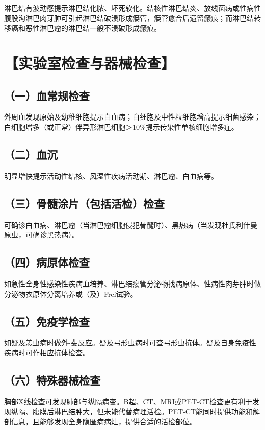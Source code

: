 淋巴结有波动感提示淋巴结化脓、坏死软化。结核性淋巴结炎、放线菌病或性病性腹股沟淋巴肉芽肿可引起淋巴结破溃形成瘘管，瘘管愈合后遗留瘢痕；而淋巴结转移癌和恶性淋巴瘤的淋巴结一般不溃破形成瘢痕。

\section{【实验室检查与器械检查】}

\subsection{（一）血常规检查}

外周血发现原始及幼稚细胞提示白血病；白细胞及中性粒细胞增高提示细菌感染；白细胞增多（或正常）伴异形淋巴细胞＞10\%提示传染性单核细胞增多症。

\subsection{（二）血沉}

明显增快提示活动性结核、风湿性疾病活动期、淋巴瘤、白血病等。

\subsection{（三）骨髓涂片（包括活检）检查}

可确诊白血病、淋巴瘤（当淋巴瘤细胞侵犯骨髓时）、黑热病（当发现杜氏利什曼原虫，可确诊黑热病）。

\subsection{（四）病原体检查}

如急性全身性感染性疾病血培养、淋巴结瘘管分泌物找病原体、性病性肉芽肿时做分泌物衣原体分离培养或（及）Frei试验。

\subsection{（五）免疫学检查}

如疑及恙虫病时做外-斐反应。疑及弓形虫病时可查弓形虫抗体。疑及自身免疫性疾病时可作相应抗体检查。

\subsection{（六）特殊器械检查}

胸部X线检查可发现肺部与纵隔病变。B超、CT、MRI或PET-CT检查更有利于发现纵隔、腹膜后淋巴结肿大，但未能代替病理活检。PET-CT能同时提供功能和解剖信息，且能够发现全身隐匿病病灶，提供合适的活检部位。


